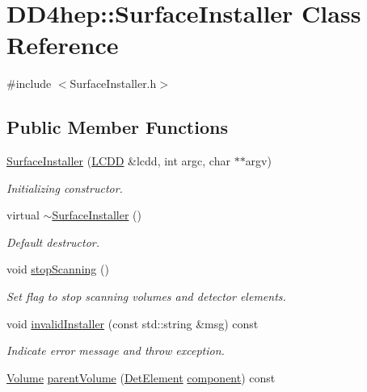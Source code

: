 \hypertarget{class_d_d4hep_1_1_surface_installer}{}\section{D\+D4hep\+:\+:Surface\+Installer Class Reference}
\label{class_d_d4hep_1_1_surface_installer}


{\ttfamily \#include $<$Surface\+Installer.\+h$>$}

\subsection*{Public Member Functions}
\begin{DoxyCompactItemize}
\item 
\hyperlink{class_d_d4hep_1_1_surface_installer_a3d66822b1627a31f133d29f0c330b82c}{Surface\+Installer} (\hyperlink{class_d_d4hep_1_1_surface_installer_a155d137884c31b56d13fb58846e562a3}{L\+C\+DD} \&lcdd, int argc, char $\ast$$\ast$argv)
\begin{DoxyCompactList}\small\item\em Initializing constructor. \end{DoxyCompactList}\item 
virtual \hyperlink{class_d_d4hep_1_1_surface_installer_a4fa5c2ba032d20b735556b8e90aacfdb}{$\sim$\+Surface\+Installer} ()
\begin{DoxyCompactList}\small\item\em Default destructor. \end{DoxyCompactList}\item 
void \hyperlink{class_d_d4hep_1_1_surface_installer_a57fe4482c0759fc874a4248c0f4d89d8}{stop\+Scanning} ()
\begin{DoxyCompactList}\small\item\em Set flag to stop scanning volumes and detector elements. \end{DoxyCompactList}\item 
void \hyperlink{class_d_d4hep_1_1_surface_installer_af6761e35e5d044953ef55b08771d4be7}{invalid\+Installer} (const std\+::string \&msg) const
\begin{DoxyCompactList}\small\item\em Indicate error message and throw exception. \end{DoxyCompactList}\item 
\hyperlink{class_d_d4hep_1_1_surface_installer_a32a727cbf3cfca5204b7eaf344a5304f}{Volume} \hyperlink{class_d_d4hep_1_1_surface_installer_ad8f0a56b5a2dd3c293316a1415c24e59}{parent\+Volume} (\hyperlink{class_d_d4hep_1_1_surface_installer_ab88f41bd9efd54b4b67baee892bfa926}{Det\+Element} \hyperlink{namespace_d_d4hep_a9bd7c6fd6580a172a3d0a09eb3ea4793}{component}) const
$$
\end{DoxyCompactItemize}
